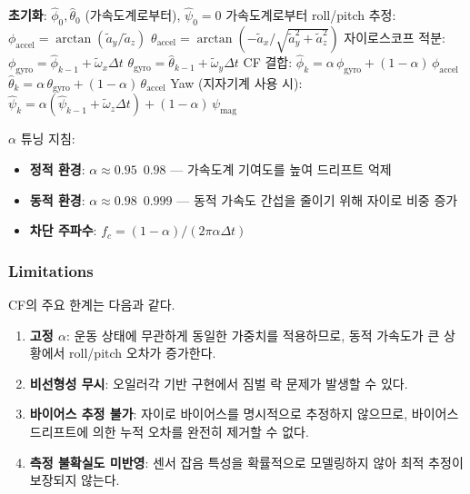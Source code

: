 \begin{algorithm}[H]
    \caption{Complementary Filter}
    \label{alg:cf}
    \begin{algorithmic}[1]
        \State \textbf{초기화}: $\hat{\phi}_0, \hat{\theta}_0$ (가속도계로부터), $\hat{\psi}_0 = 0$
            \State 가속도계로부터 roll/pitch 추정:
            \State \quad $\phi_{\text{accel}} = \arctan(\tilde{a}_y / \tilde{a}_z)$
            \State \quad $\theta_{\text{accel}} = \arctan(-\tilde{a}_x / \sqrt{\tilde{a}_y^2 + \tilde{a}_z^2})$
            \State 자이로스코프 적분:
            \State \quad $\phi_{\text{gyro}} = \hat{\phi}_{k-1} + \tilde{\omega}_x \Delta t$
            \State \quad $\theta_{\text{gyro}} = \hat{\theta}_{k-1} + \tilde{\omega}_y \Delta t$
            \State CF 결합:
            \State \quad $\hat{\phi}_k = \alpha\,\phi_{\text{gyro}} + (1-\alpha)\,\phi_{\text{accel}}$
            \State \quad $\hat{\theta}_k = \alpha\,\theta_{\text{gyro}} + (1-\alpha)\,\theta_{\text{accel}}$
            \State Yaw (지자기계 사용 시):
            \State \quad $\hat{\psi}_k = \alpha(\hat{\psi}_{k-1} + \tilde{\omega}_z \Delta t) + (1-\alpha)\,\psi_{\text{mag}}$
        \EndFor
    \end{algorithmic}
\end{algorithm}

$\alpha$ 튜닝 지침:
\begin{itemize}
    \item \textbf{정적 환경}: $\alpha \approx 0.95$~$0.98$ — 가속도계 기여도를 높여 드리프트 억제
    \item \textbf{동적 환경}: $\alpha \approx 0.98$~$0.999$ — 동적 가속도 간섭을 줄이기 위해 자이로 비중 증가
    \item \textbf{차단 주파수}: $f_c = (1-\alpha) / (2\pi\alpha\Delta t)$
\end{itemize}

\subsubsection{Limitations}

CF의 주요 한계는 다음과 같다.

\begin{enumerate}
    \item \textbf{고정 $\alpha$}: 운동 상태에 무관하게 동일한 가중치를 적용하므로,
          동적 가속도가 큰 상황에서 roll/pitch 오차가 증가한다.
    \item \textbf{비선형성 무시}: 오일러각 기반 구현에서 짐벌 락 문제가 발생할 수 있다.
    \item \textbf{바이어스 추정 불가}: 자이로 바이어스를 명시적으로 추정하지 않으므로,
          바이어스 드리프트에 의한 누적 오차를 완전히 제거할 수 없다.
    \item \textbf{측정 불확실도 미반영}: 센서 잡음 특성을 확률적으로 모델링하지 않아
          최적 추정이 보장되지 않는다.
\end{enumerate}

